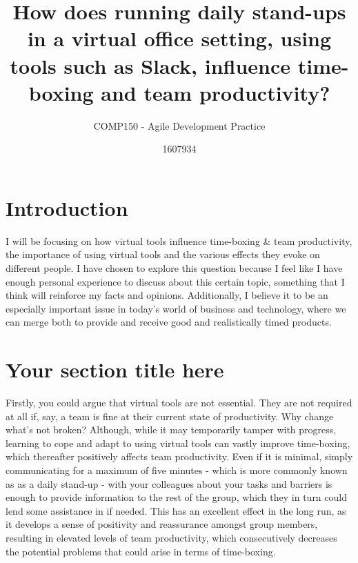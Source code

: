 \documentclass{scrartcl}
\title{How does running daily stand-ups in a virtual office setting, using tools such as Slack, influence time-boxing and team productivity?}
\subtitle{COMP150 - Agile Development Practice}
\author{1607934}
\begin{document}
\maketitle


\section{Introduction}

I will be focusing on how virtual tools influence time-boxing & team productivity, the importance of using virtual tools and the various effects they evoke on different people. I have chosen to explore this question because I feel like I have enough personal experience to discuss about this certain topic, something that I think will reinforce my facts and opinions. Additionally, I believe it to be an especially important issue in today's world of business and technology, where we can merge both to provide and receive good and realistically timed products.


\section{Your section title here}

Firstly, you could argue that virtual tools are not essential. They are not required at all if, say, a team is fine at their current state of productivity. Why change what's not broken? Although, while it may temporarily tamper with progress, learning to cope and adapt to using virtual tools can vastly improve time-boxing, which thereafter positively affects team productivity. Even if it is minimal, simply communicating for a maximum of five minutes - which is more commonly known as as a daily stand-up - with your colleagues about your tasks and barriers is enough to provide information to the rest of the group, which they in turn could lend some assistance in if needed. This has an excellent effect in the long run, as it develops a sense of positivity and reassurance amongst group members, resulting in elevated levels of team productivity, which consecutively decreases the potential problems that could arise in terms of time-boxing.
\end{document}
